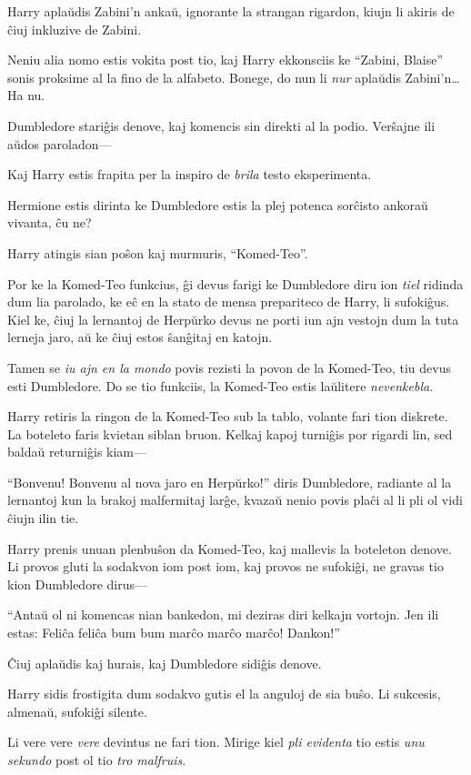 Harry aplaŭdis Zabini'n ankaŭ, ignorante la strangan rigardon, kiujn li
akiris de ĉiuj inkluzive de Zabini.

Neniu alia nomo estis vokita post tio, kaj Harry ekkonsciis ke
``Zabini, Blaise'' sonis proksime al la fino de la alfabeto. Bonege,
do nun li \emph{nur} aplaŭdis Zabini'n\ldots Ha nu.

Dumbledore stariĝis denove, kaj komencis sin direkti al la
podio. Verŝajne ili aŭdos paroladon—

Kaj Harry estis frapita per la inspiro de \emph{brila} testo
eksperimenta.

Hermione estis dirinta ke Dumbledore estis la plej potenca sorĉisto
ankoraŭ vivanta, ĉu ne?

Harry atingis sian poŝon kaj murmuris, ``Komed-Teo''.

Por ke la Komed-Teo funkcius, ĝi devus farigi ke Dumbledore diru ion
\emph{tiel} ridinda dum lia parolado, ke eĉ en la stato de mensa
prepariteco de Harry, li sufokiĝus. Kiel ke, ĉiuj la
lernantoj de Herpŭrko devus ne porti iun ajn vestojn dum la tuta
lerneja jaro, aŭ ke ĉiuj estos ŝanĝitaj en katojn.

Tamen se \emph{iu ajn en la mondo} povis rezisti la povon de la
Komed-Teo, tiu devus esti Dumbledore. Do se tio funkciis, la Komed-Teo
estis laŭlitere \emph{nevenkebla}.

Harry retiris la ringon de la Komed-Teo sub la tablo, volante fari
tion diskrete. La boteleto faris kvietan siblan bruon. Kelkaj kapoj
turniĝis por rigardi lin, sed baldaŭ returniĝis kiam—

``Bonvenu! Bonvenu al nova jaro en Herpŭrko!'' diris Dumbledore,
radiante al la lernantoj kun la brakoj malfermitaj larĝe, kvazaŭ
nenio povis plaĉi al li pli ol vidi ĉiujn ilin tie.

Harry prenis unuan plenbuŝon da Komed-Teo, kaj mallevis la boteleton
denove. Li provos gluti la sodakvon iom post iom, kaj provos ne
sufokiĝi, ne gravas tio kion Dumbledore dirus—

``Antaŭ ol ni komencas nian bankedon, mi deziras diri kelkajn
vortojn. Jen ili estas: Feliĉa feliĉa bum bum marĉo marĉo marĉo!
Dankon!''

Ĉiuj aplaŭdis kaj hurais, kaj Dumbledore sidiĝis denove.

Harry sidis frostigita dum sodakvo gutis el la anguloj de sia buŝo. Li
sukcesis, almenaŭ, sufokiĝi silente.

Li vere vere \emph{vere} devintus ne fari tion. Mirige kiel \emph{pli
  evidenta} tio estis \emph{unu sekundo} post ol tio \emph{tro
  malfruis}.

